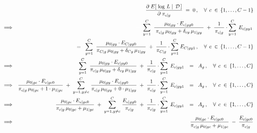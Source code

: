 \begin{eqnarray*}
&&
	\dfrac{\partial\;E\!\left[\,\left.\log\,L\;\right\vert\;\mathcal{D}\,\right]}{\partial\;\pi_{c \vert g}} \;=\; 0\,,
	\quad\forall\;\,c\;\in\,\{1,\ldots,C-1\}
\\
&\Longrightarrow&
	\;{\color{white}=} \;\;
		\overset{C}{\underset{y=1}{\sum}}\;\;
		\dfrac{\mu_{0 \vert gy} \cdot E_{c \vert gy0}}{
			{\color{white}.}
			\pi_{c \vert g}\,\mu_{0 \vert gy} + \delta_{cy}\,\mu_{1\vert gy}
			{\color{white}.}
			}
		\; + \;
		\dfrac{1}{
			{\color{white}\vert}\!
			\pi_{c \vert g}
			\!{\color{white}\vert}
			}
		\cdot
			\overset{C}{\underset{y=1}{\sum}}\;
			\,E_{c \vert gy1}\,
\\
&&
	= \;\;
		\overset{C}{\underset{y=1}{\sum}}\;\;
		\dfrac{\mu_{0 \vert gy} \cdot E_{C \vert gy0}}{\pi_{C \vert g}\,\mu_{0 \vert gy} + \delta_{Cy}\,\mu_{1\vert gy}}
		\; + \;
		\dfrac{1}{\pi_{C \vert g}}
		\cdot
			\overset{C}{\underset{y=1}{\sum}}\;
			E_{C \vert gy1}\,,
		\quad\forall\;\,c\;\in\,\{1,\ldots,C-1\}
\\
&\Longrightarrow&
		\overset{C}{\underset{y=1}{\sum}}\;\;
		\dfrac{\mu_{0 \vert gy} \cdot E_{c \vert gy0}}{
			\pi_{c \vert g}\,\mu_{0 \vert gy} + \delta_{cy}\,\mu_{1\vert gy}
			}
		\; + \;
		\dfrac{1}{\pi_{c \vert g}}
		\cdot
			\overset{C}{\underset{y=1}{\sum}}\;
			\,E_{c \vert gy1}\,
		\;\; = \;\;
		A_{g}\,,
		\quad\forall\;\,c\;\in\,\{1,\ldots,C\}
\\
&\Longrightarrow&
		\dfrac{\mu_{0 \vert gc} \cdot E_{c \vert gc0}}{
			\pi_{c \vert g}\,\mu_{0 \vert gc} + 1\cdot\mu_{1\vert gc}
			}
		\; + \;
		\overset{C}{\underset{y=1,y\neq c}{\sum}}\;
		\dfrac{\mu_{0 \vert gy} \cdot E_{c \vert gy0}}{
			\pi_{c \vert g}\,\mu_{0 \vert gy} + 0\cdot\mu_{1\vert gy}
			}
		\; + \;
		\dfrac{1}{\pi_{c \vert g}}
		\cdot
			\overset{C}{\underset{y=1}{\sum}}\;
			\,E_{c \vert gy1}\,
		\;\; = \;\;
		A_{g}\,,
		\quad\forall\;\,c\;\in\,\{1,\ldots,C\}
\\
&\Longrightarrow&
		\dfrac{\mu_{0 \vert gc} \cdot E_{c \vert gc0}}{
			\pi_{c \vert g}\,\mu_{0 \vert gc} + \mu_{1\vert gc}
			}
		\; + \;
		\overset{C}{\underset{y=1,y\neq c}{\sum}}\;
		\dfrac{E_{c \vert gy0}}{\pi_{c \vert g}}
		\; + \;
		\dfrac{1}{\pi_{c \vert g}}
		\cdot
			\overset{C}{\underset{y=1}{\sum}}\;
			\,E_{c \vert gy1}\,
		\;\; = \;\;
		A_{g}\,,
		\quad\forall\;\,c\;\in\,\{1,\ldots,C\}
\\
&\Longrightarrow&
		\dfrac{\mu_{0 \vert gc} \cdot E_{c \vert gc0}}{
			\pi_{c \vert g}\,\mu_{0 \vert gc} + \mu_{1\vert gc}
			}
		\; - \;
		\dfrac{E_{c \vert gc0}}{\pi_{c \vert g}}

\end{eqnarray*}
